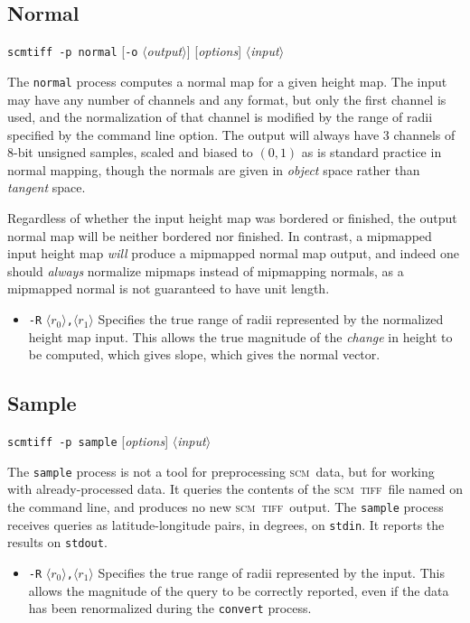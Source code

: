 \documentclass[oneside,10pt]{memoir}
\newcommand{\scm}     {\textsc{scm}}
\newcommand{\tiff}    {\textsc{tiff}}
\newcommand{\scmtiff} {\texttt{scmtiff}}
\newcommand{\inangles}[1]{$\langle$#1$\rangle$}
\newenvironment{optionlist}
  {\setlength{\leftmargini}{1in}\begin{itemize}}{\end{itemize}}
\begin{document}
\begin{Spacing}{1.1}
\subsection{Normal}

\noindent\scmtiff\ \texttt{-p normal} [\texttt{-o} \inangles{\textit{output}}] [\textit{options}] \inangles{\textit{input}}

\bigskip The \texttt{normal} process computes a normal map for a given height map. The input may have any number of channels and any format, but only the first channel is used, and the normalization of that channel is modified by the range of radii specified by the command line option. The output will always have 3 channels of 8-bit unsigned samples, scaled and biased to $(0,1)$ as is standard practice in normal mapping, though the normals are given in \emph{object} space rather than \emph{tangent} space.

Regardless of whether the input height map was bordered or finished, the output normal map will be neither bordered nor finished. In contrast, a mipmapped input height map \emph{will} produce a mipmapped normal map output, and indeed one should \emph{always} normalize mipmaps instead of mipmapping normals, as a mipmapped normal is not guaranteed to have unit length.

\begin{optionlist}
\item[\texttt{-R} \inangles{$r_0$}\texttt{,}\inangles{$r_1$}] Specifies the true range of radii represented by the normalized height map input. This allows the true magnitude of the \emph{change} in height to be computed, which gives slope, which gives the normal vector.
\end{optionlist}

\subsection{Sample}

\noindent\scmtiff\ \texttt{-p sample} [\textit{options}] \inangles{\textit{input}}

\bigskip The \texttt{sample} process is not a tool for preprocessing \scm\ data, but for working with already-processed data. It queries the contents of the \scm\ \tiff\ file named on the command line, and produces no new \scm\ \tiff\ output. The \texttt{sample} process receives queries as latitude-longitude pairs, in degrees, on \texttt{stdin}. It reports the results on \texttt{stdout}.

\begin{optionlist}
\item[\texttt{-R} \inangles{$r_0$}\texttt{,}\inangles{$r_1$}] Specifies the true range of radii represented by the input. This allows the magnitude of the query to be correctly reported, even if the data has been renormalized during the \texttt{convert} process.
\end{optionlist}


\end{Spacing}
\end{document}
